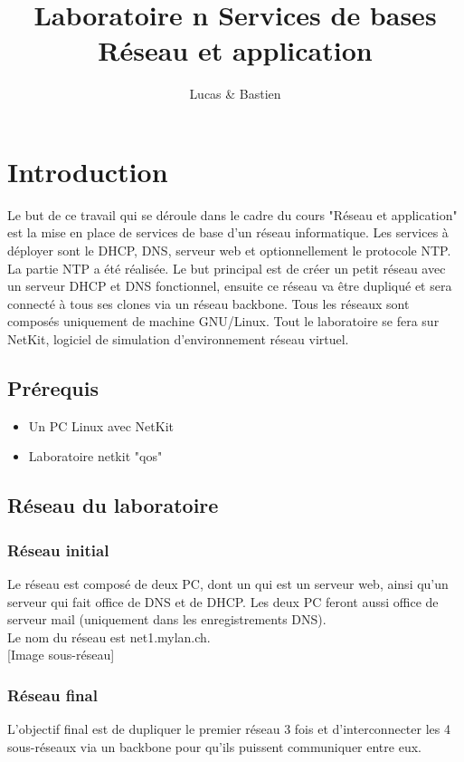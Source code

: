 \documentclass{article}
\title{%
	Laboratoire n\degre 6 Services de bases\\
	\large Réseau et application
}
\author{\bsc{Bulloni} Lucas \& \bsc{Wermeille} Bastien}
\begin{document}
\maketitle

\newpage

\tableofcontents

\newpage

\section{Introduction}
Le but de ce travail qui se déroule dans le cadre du cours "Réseau et application" est la mise en place de services de base d'un réseau informatique. Les services à déployer sont le DHCP, DNS, serveur web et optionnellement le protocole NTP. La partie NTP a été réalisée. Le but principal est de créer un petit réseau avec un serveur DHCP et DNS fonctionnel, ensuite ce réseau va être dupliqué et sera connecté à tous ses clones via un réseau backbone. Tous les réseaux sont composés uniquement de machine GNU/Linux. Tout le laboratoire se fera sur NetKit, logiciel de simulation d'environnement réseau virtuel.

\subsection{Prérequis}
\begin{itemize}
	\item Un PC Linux avec NetKit
	\item Laboratoire netkit "qos"
\end{itemize}
\subsection{Réseau du laboratoire}

\subsubsection{Réseau initial}
Le réseau est composé de deux PC, dont un qui est un serveur web, ainsi qu'un serveur qui fait office de DNS et de DHCP. Les deux PC feront aussi office de serveur mail (uniquement dans les enregistrements DNS).\\

Le nom du réseau est net1.mylan.ch.\\

[Image sous-réseau]

\subsubsection{Réseau final}
L'objectif final est de dupliquer le premier réseau 3 fois et d'interconnecter les 4 sous-réseaux via un backbone pour qu'ils puissent communiquer entre eux.\\
\end{document}
